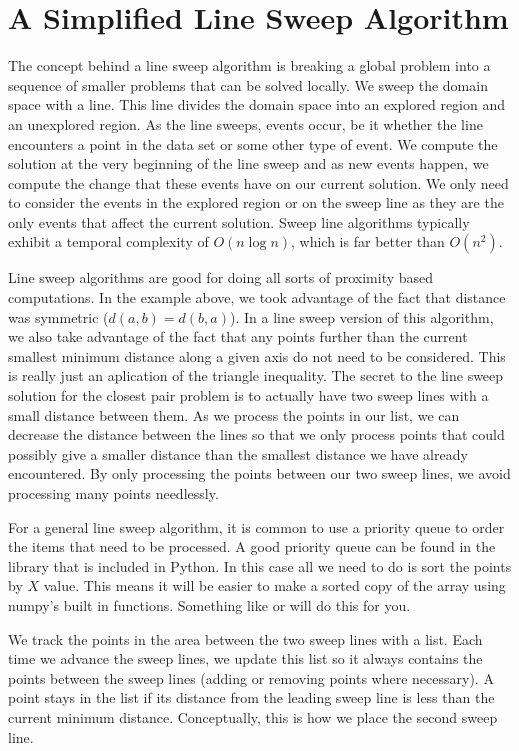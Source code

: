 \section*{A Simplified Line Sweep Algorithm}

The concept behind a line sweep algorithm is breaking a global problem into a sequence of smaller problems that can be solved locally.
We sweep the domain space with a line.
This line divides the domain space into an explored region and an unexplored region.
As the line sweeps, events occur, be it whether the line encounters a point in the data set
or some other type of event.  
We compute the solution at the very beginning of the line sweep and as new events happen, we compute the change that these events have on our current solution.
We only need to consider the events in the explored region or on the sweep line as they are the only events that affect the current solution.  
Sweep line algorithms typically exhibit a temporal complexity of $O(n \log n)$, which is far better than $O(n^2)$.

Line sweep algorithms are good for doing all sorts of proximity based computations.
In the example above, we took advantage of the fact that distance was symmetric ($d(a,b)=d(b,a)$).
In a line sweep version of this algorithm, we also take advantage of the fact that any points further than the current smallest minimum distance along a given axis do not need to be considered.
This is really just an aplication of the triangle inequality.
The secret to the line sweep solution for the closest pair problem is to actually have two sweep lines with a small distance between them.
As we process the points in our list, we can decrease the distance between the lines so that we only process points that could possibly give a smaller distance than the smallest distance we have already encountered.
By only processing the points between our two sweep lines, we avoid processing many points needlessly.

For a general line sweep algorithm, it is common to use a priority queue to order the items that need to be processed.
A good priority queue can be found in the library  that is included in Python. 
In this case all we need to do is sort the points by $X$ value.
This means it will be easier to make a sorted copy of the array using numpy's built in functions.
Something like  or  will do this for you. 

We track the points in the area between the two sweep lines with a list.
Each time we advance the sweep lines, we update this list so it always contains the points between the sweep lines (adding or removing points where necessary).
A point stays in the list if its distance from the leading sweep line is less than the current minimum distance.
Conceptually, this is how we place the second sweep line.

